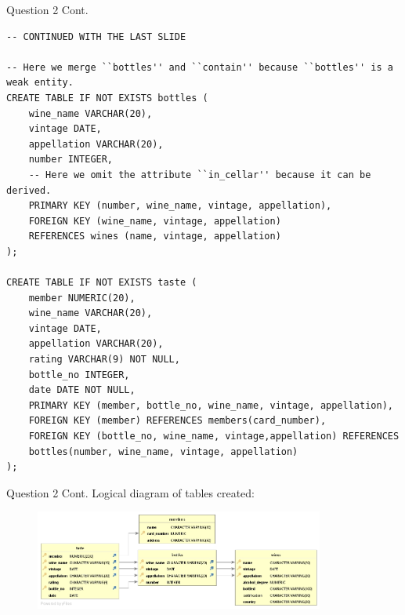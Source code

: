 \begin{frame}[fragile]{Question 2 Cont.}
\begin{lstlisting}[style=sql-small, firstnumber=17]
-- CONTINUED WITH THE LAST SLIDE

-- Here we merge ``bottles'' and ``contain'' because ``bottles'' is a weak entity. 
CREATE TABLE IF NOT EXISTS bottles (
	wine_name VARCHAR(20),
	vintage DATE,
	appellation VARCHAR(20),
	number INTEGER,
	-- Here we omit the attribute ``in_cellar'' because it can be derived.
	PRIMARY KEY (number, wine_name, vintage, appellation),
	FOREIGN KEY (wine_name, vintage, appellation)
	REFERENCES wines (name, vintage, appellation)
);

CREATE TABLE IF NOT EXISTS taste (
	member NUMERIC(20),
	wine_name VARCHAR(20),
	vintage DATE,
	appellation VARCHAR(20),
	rating VARCHAR(9) NOT NULL,
	bottle_no INTEGER,
	date DATE NOT NULL,
	PRIMARY KEY (member, bottle_no, wine_name, vintage, appellation),
	FOREIGN KEY (member) REFERENCES members(card_number),
	FOREIGN KEY (bottle_no, wine_name, vintage,appellation) REFERENCES 
	bottles(number, wine_name, vintage, appellation)
);
\end{lstlisting}
\end{frame}

\begin{frame}[fragile]{Question 2 Cont.}
Logical diagram of tables created:

\begin{figure}
	\includegraphics[width=0.85\textwidth, trim=0 0 0 0, clip]{t4/images/logical_diagram.jpg}
\end{figure}
\end{frame}


